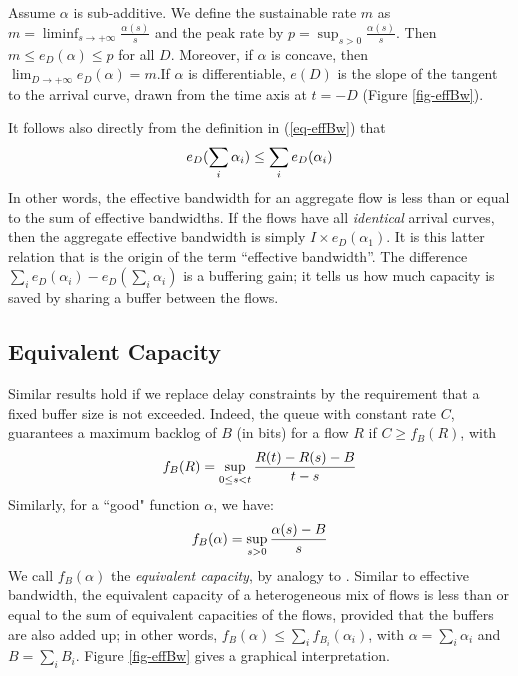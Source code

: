 Assume $\alpha$ is sub-additive. We define the sustainable rate
$m$ as $m=\liminf_{s\rightarrow +\infty} \frac{\alpha(s)}{s}$ and
the peak rate by $p = \sup_{s>0}\frac{\alpha(s)}{s}$.  Then $m
\leq e_{D}(\alpha) \leq p$ for all $D$.  Moreover, if $\alpha $ is
concave, then $\lim_{D \rightarrow + \infty} e_{D}(\alpha) = m$.If
$\alpha$ is differentiable, $e(D)$ is the slope of the tangent to
the arrival curve, drawn from the time axis at $t=-D$ (Figure
\ref{fig-effBw}).
\begin{figure}[!htbp]
\end{figure}
It follows also directly from the definition in (\ref{eq-effBw})
that
\begin{equation}
    e_{D}(\sum_{i} \alpha_{i})  \leq \sum_{i}e_{D}(\alpha_{i})
    \mylabel{eq-netcal-y<nmjjkwe889237834hj}
\end{equation}
In other words, the effective bandwidth for an aggregate flow is
less than or equal to the sum of effective bandwidths.  If the
flows have all \emph{identical} arrival curves, then the aggregate
effective bandwidth is simply $ I\times e_{D}(\alpha_{1})$.  It is
this latter relation that is the origin of the term ``effective
bandwidth''. The difference $\sum_{i}e_{D}(\alpha_{i}) -
e_{D}(\sum_{i} \alpha_{i})$ is a buffering gain; it tells us how
much capacity is saved by sharing a buffer between the flows.

\subsection{Equivalent Capacity}
 Similar results hold if we replace delay constraints by the
requirement that a fixed buffer size is not exceeded. Indeed, the
queue with constant rate $C$, guarantees a maximum backlog of $B$
(in bits) for a flow $R$ if $C \geq f_{B}(R)$, with
\begin{equation}
f_{B}(R) = \sup_{0 \leq s < t} \frac{R(t)-R(s)-B}{t-s}
\mylabel{eq-eqCapa}
\end{equation}
Similarly, for a ``good" function $\alpha$, we have:
\begin{equation}
f_{B}(\alpha) = \sup_{s > 0} \frac{\alpha(s)-B}{s}
\mylabel{eq-eqCapa2}
\end{equation}
We call $f_{B}(\alpha)$ the \emph{equivalent capacity}, by analogy
to \cite{autobahn}.  Similar to effective bandwidth, the
equivalent capacity of a heterogeneous mix of flows is less than
or equal to the sum of equivalent capacities of the flows,
provided that the buffers are also added up; in other words,
$f_{B}(\alpha)  \leq \sum_{i}f_{B_{i}}(\alpha_{i})$, with $\alpha
= \sum_{i} \alpha_{i}$ and $B= \sum_{i}B_{i}$. Figure
\ref{fig-effBw} gives a graphical interpretation.

